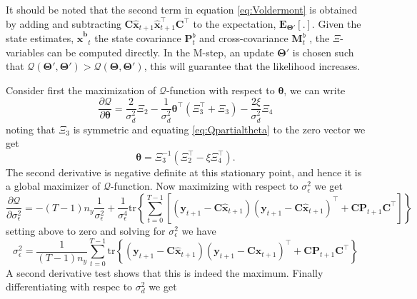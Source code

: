 \documentclass[]{article}
\begin{document}
It should be noted that the second term in equation \ref{eq:Voldermont} is obtained by adding and subtracting $\mathbf C \mathbf{\hat{x}}_{t+1} \mathbf{\hat{x}}_{t+1}^\top \mathbf C^\top$ to the expectation, $\mathbf E_{\boldsymbol\Theta'}\left[ .\right] $. Given the state estimates, $\mathbf {\hat x^{b}}_t$ the state covariance $\mathbf P_t^b$ and cross-covariance $\mathbf M_t^b$ , the $\Xi$-variables can be computed directly. In the M-step, an update $\boldsymbol\Theta'$ is chosen such that $\mathcal{Q}\left(\boldsymbol\Theta',\boldsymbol\Theta'\right)>\mathcal{Q}\left(\boldsymbol\Theta,\boldsymbol\Theta'\right)$, this will guarantee that the likelihood increases. 

Consider first the maximization of $\mathcal{Q}$-function with respect to $\boldsymbol\theta$, we can write
\begin{equation}\label{eq:Qpartialtheta}
 \frac{\partial \mathcal Q}{\partial \boldsymbol\theta}=\frac{2}{\sigma_d^2}\Xi_2-\frac{1}{\sigma_d^2}\boldsymbol\theta^\top(\Xi_3^\top+\Xi_3)-\frac{2\xi}{\sigma_d^2}\Xi_4
\end{equation}
noting that $\Xi_3$ is symmetric and equating \ref{eq:Qpartialtheta} to the zero vector we get
\begin{equation}\label{eq:theta}
 \boldsymbol \theta=\Xi_3^{-1}\left(\Xi_2^\top-\xi\Xi_4^\top \right).
\end{equation}
The second derivative is negative definite at this stationary point, and hence it is a global maximizer of $\mathcal{Q}$-function.
Now maximizing with respect to $\sigma_{\epsilon}^2$ we get
\begin{equation}
  \frac{\partial \mathcal Q}{\partial \sigma_{\epsilon}^2}=-(T-1)n_y\frac{1}{\sigma_{\epsilon}^2}+\frac{1}{\sigma_{\epsilon}^4}\mathrm{tr}\left\lbrace\sum_{t=0}^{T-1}\left[ (\mathbf y_{t+1}-\mathbf C\mathbf{\hat{x}}_{t+1}) (\mathbf y_{t+1}-\mathbf C\mathbf{\hat{x}}_{t+1})^\top+\mathbf C \mathbf P_{t+1}\mathbf C^\top\right] \right\rbrace
\end{equation}
setting above to zero and solving for $\sigma_{\epsilon}^2$ we have
\begin{equation}
 \sigma_{\epsilon}^2=\frac{1}{(T-1)n_y}\sum_{t=0}^{T-1}\mathrm{tr}\left\lbrace (\mathbf y_{t+1}-\mathbf C\mathbf{\hat{x}}_{t+1}) (\mathbf y_{t+1}-\mathbf C\mathbf{\hat{x}}_{t+1})^\top+\mathbf C \mathbf P_{t+1}\mathbf C^\top \right\rbrace
\end{equation}
A second derivative test shows that this is indeed the maximum. Finally differentiating with respec to $\sigma_d^2$ we get
\end{document}
